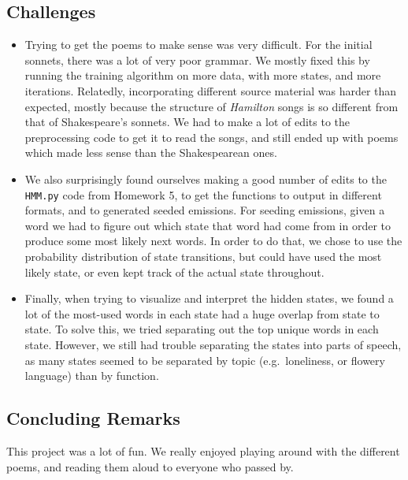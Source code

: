 \subsection{Challenges}
\begin{itemize}
	\item Trying to get the poems to make sense was very difficult.  For the initial sonnets, there was a lot of very poor grammar.  We mostly fixed this by running the training algorithm on more data, with more states, and more iterations.
Relatedly, incorporating different source material was harder than expected, mostly because the structure of \emph{Hamilton} songs is so different from that of Shakespeare's sonnets.  We had to make a lot of edits to the preprocessing code to get it to read the songs, and still ended up with poems which made less sense than the Shakespearean ones.
	\item We also surprisingly found ourselves making a good number of edits to the {\tt HMM.py} code from Homework 5, to get the functions to output in different formats, and to generated seeded emissions.  For seeding emissions, given a word we had to figure out which state that word had come from in order to produce some most likely next words.  In order to do that, we chose to use the probability distribution of state transitions, but could have used the most likely state, or even kept track of the actual state throughout.
	\item Finally, when trying to visualize and interpret the hidden states, we found a lot of the most-used words in each state had a huge overlap from state to state.  To solve this, we tried separating out the top unique words in each state.  However, we still had trouble separating the states into parts of speech, as many states seemed to be separated by topic (e.g.\ loneliness, or flowery language) than by function.
\end{itemize}



\subsection{Concluding Remarks}

This project was a lot of fun.  We really enjoyed playing around with the different poems, and reading them aloud to everyone who passed by.  








